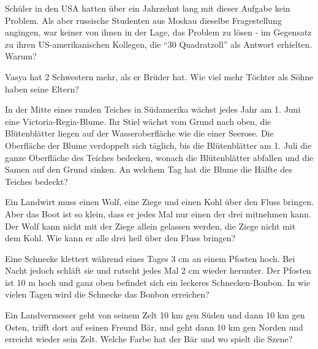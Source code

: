 \documentclass[12pt]{article} %
\begin{document}
Schüler in den USA hatten über ein Jahrzehnt lang mit dieser Aufgabe kein Problem. Als aber russische Studenten aus Moskau dieselbe Fragestellung angingen, war keiner von ihnen in der Lage, das Problem zu lösen - im Gegensatz zu ihren US-amerikanischen Kollegen, die “30 Quadratzoll” als Antwort erhielten. Warum?
\newline\newline\quad


 Vasya hat 2 Schwestern mehr, als er Brüder hat. Wie viel mehr Töchter als Söhne haben seine Eltern?
\newline\newline\quad


 In der Mitte eines runden Teiches in Südamerika wächst jedes Jahr am 1. Juni eine Victoria-Regia-Blume. Ihr Stiel wächst vom Grund nach oben, die Blütenblätter liegen auf der Wasseroberfläche wie die einer Seerose. Die Oberfläche der Blume verdoppelt sich täglich, bis die Blütenblätter am 1. Juli die ganze Oberfläche des Teiches bedecken, wonach die Blütenblätter abfallen und die Samen auf den Grund sinken. An welchem Tag hat die Blume die Hälfte des Teiches bedeckt? 
\newline\newline\quad


 Ein Landwirt muss einen Wolf, eine Ziege und einen Kohl über den Fluss bringen. Aber das Boot ist so klein, dass er jedes Mal nur einen der drei mitnehmen kann. Der Wolf kann nicht mit der Ziege allein gelassen werden, die Ziege nicht mit dem Kohl. Wie kann er alle drei heil über den Fluss bringen? 
\newline\newline\quad


 Eine Schnecke klettert während eines Tages 3 cm an einem Pfosten hoch. Bei Nacht jedoch schläft sie und rutscht jedes Mal 2 cm wieder herunter. Der Pfosten ist 10 m hoch und ganz oben befindet sich ein leckeres Schnecken-Bonbon. In wie vielen Tagen wird die Schnecke das Bonbon erreichen?
\newline\newline\quad


 Ein Landvermesser geht von seinem Zelt 10 km gen Süden und dann 10 km gen Osten, trifft dort auf seinen Freund Bär, und geht dann 10 km gen Norden und erreicht wieder sein Zelt. Welche Farbe hat der Bär und wo spielt die Szene?
\newline\newline\quad
\end{document}

